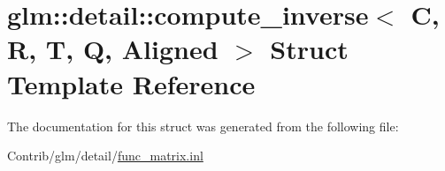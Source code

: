 \hypertarget{structglm_1_1detail_1_1compute__inverse}{}\section{glm\+:\+:detail\+:\+:compute\+\_\+inverse$<$ C, R, T, Q, Aligned $>$ Struct Template Reference}
\label{structglm_1_1detail_1_1compute__inverse}


The documentation for this struct was generated from the following file\+:\begin{DoxyCompactItemize}
\item 
Contrib/glm/detail/\mbox{\hyperlink{func__matrix_8inl}{func\+\_\+matrix.\+inl}}\end{DoxyCompactItemize}
